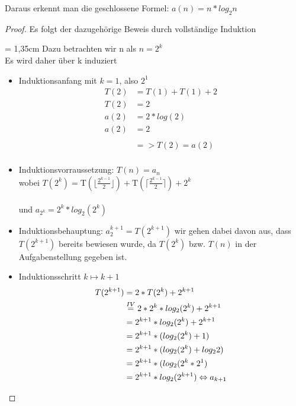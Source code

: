 Daraus erkennt man die geschlossene Formel: $a(n) = n * log_{2}n$

\begin{proof}
        Es folgt der dazugehörige Beweis durch vollständige Induktion 
        \par
        \begingroup
        \leftskip = 1,35cm
        \noindent
			Dazu betrachten wir n als $n=2^k$\\
			Es wird daher über k induziert
		\par
        \endgroup
        

	\begin{itemize}
	\item Induktionsanfang mit $k=1$, also $2^1$
		\begin{equation}
			\begin{aligned}
				T(2) &= T(1) + T(1) + 2 \\
				T(2) &= 2 			 \\
     			a(2) &= 2 * log(2	)	 \\
  				a(2) &= 2 			 \\
  				\\
     			&=> T(2) = a(2)\\
			\end{aligned}
		\end{equation}
		
		
		
        
    \item Induktionsvorraussetzung: $T(n) = a_{n}$\\
    	wobei $T(2^k) = \text{T}\left(\lfloor{\frac{2^{k-1}}{2}}\rfloor\right) + \text{T}\left(\lceil{\frac{2^{k-1}}{2}}\rceil\right) + 2^k$\\
        \\
    	und $a_{2^k} = 2^k * log_{2}(2^k)$
    \item Induktionsbehauptung: $a_2^{k+1} = T(2^{k+1})$ 
    	wir gehen dabei davon aus, dass $T(2^{k+1})$ bereits bewiesen wurde, da $T(2^k)$ bzw. $T(n)$ in der Aufgabenstellung gegeben ist.   
    \item Induktionsschritt $k \mapsto k+1$ \\
		\begin{equation}
			\begin{aligned}
				 T(2^{k+1}) &= 2 * T(2^k) + 2^{k+1} \\
						    &\overset{IV}{=} 2 * 2^k * log_{2}(2^k) + 2^{k+1} \\
						    &= 2^{k+1} * log_{2}(2^k) + 2^{k+1} \\
						    &= 2^{k+1} * (log_{2}(2^k) + 1) \notag\\
						    &= 2^{k+1} * (log_{2}(2^k) + log_{2}2)  \\
						    &= 2^{k+1} * (log_{2}(2^k * 2^1) \\
							&= 2^{k+1} * log_{2}(2^{k+1}) \Leftrightarrow a_{k+1} \\
				
			\end{aligned}
		\end{equation}		       
   	 \end{itemize}
	\end{proof}
    
